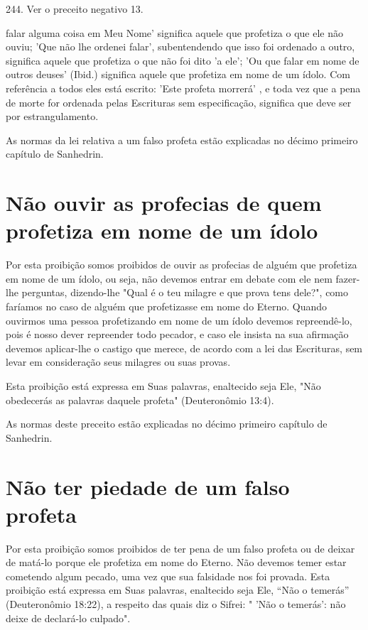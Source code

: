 244. Ver o preceito negativo 13.

falar alguma coisa em Meu Nome' significa aquele que profetiza o que ele
não ouviu; 'Que não lhe ordenei falar', subentendendo que isso foi
ordenado a ou­tro, significa aquele que profetiza o que não foi dito 'a
ele'; 'Ou que falar em nome de outros deuses' (Ibid.) significa aquele
que profetiza em nome de um ídolo. Com
referência a todos eles está escrito: 'Este profeta morrerá' , e toda
vez que a pena de morte for ordenada pelas Escrituras sem especificação,
signi­fica que deve ser por estrangulamento.

As normas da lei relativa a um falso profeta estão explicadas no déci­mo
primeiro capítulo de Sanhedrin.

\section{Não ouvir as profecias de quem profetiza em nome de um ídolo}

Por esta proibição somos proibidos de ouvir as profecias de alguém que
profetiza em nome de um ídolo, ou seja, não devemos entrar em debate com
ele nem fazer-lhe perguntas, dizendo-lhe "Qual é o teu milagre e que
pro­va tens dele?", como faríamos no caso de alguém que profetizasse em
nome do Eterno. Quando ouvirmos uma pessoa profetizando em nome de um
ídolo devemos repreendê-lo, pois é nosso dever repreender todo pecador,
e caso ele insista na sua afirmação devemos aplicar-lhe o castigo que
merece, de acordo com a lei das Escrituras, sem levar em consideração
seus milagres ou suas provas.

Esta proibição está expressa em Suas palavras, enaltecido seja Ele, "Não
obedecerás as palavras daquele profeta" (Deuteronômio 13:4).

As normas deste preceito estão explicadas no décimo primeiro capí­tulo
de Sanhedrin.

\section{Não ter piedade de um falso profeta}

Por esta proibição somos proibidos de ter pena de um falso profeta ou de
deixar de matá-lo porque ele profetiza em nome do Eterno. Não deve­mos
temer estar cometendo algum pecado, uma vez que sua falsidade nos foi
provada. Esta proibição está expressa em Suas palavras, enaltecido seja
Ele, ``Não o temerás'' (Deuteronômio 18:22), a respeito das quais diz o
Sifrei: " 'Não o temerás': não deixe de declará-lo culpado".

